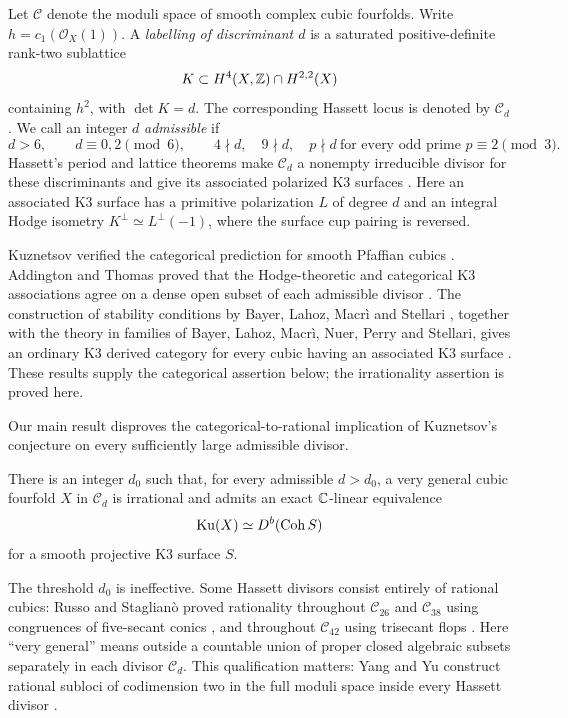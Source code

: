Let \(\mathcal C\) denote the moduli space of smooth complex cubic
fourfolds. Write \(h=c_1(\mathcal O_X(1))\). A \emph{labelling of
discriminant \(d\)} is a saturated positive-definite rank-two sublattice
\[
 K\subset H^4(X,\mathbb Z)\cap H^{2,2}(X)
\]
containing \(h^2\), with \(\det K=d\). The corresponding Hassett locus is
denoted by \(\mathcal C_d\). We call an integer \(d\) \emph{admissible} if
\begin{equation}\label{cub:admissible}
 d>6,\qquad d\equiv0,2\pmod6,\qquad
 4\nmid d,\quad 9\nmid d,\quad
 p\nmid d\ \text{for every odd prime }p\equiv2\pmod3.
\end{equation}
Hassett's period and lattice theorems make \(\mathcal C_d\) a nonempty
irreducible divisor for these discriminants and give its associated
polarized K3 surfaces \cite[Theorems~1.0.1 and~1.0.2]{Hassett00}.
Here an associated K3 surface has a primitive polarization \(L\) of
degree \(d\) and an integral Hodge isometry
\(K^\perp\simeq L^\perp(-1)\), where the surface cup pairing is reversed.

Kuznetsov verified the categorical prediction for smooth Pfaffian cubics
\cite[Theorem~3.1]{Kuznetsov10}. Addington and Thomas proved that the
Hodge-theoretic and categorical K3 associations agree on a dense open
subset of each admissible divisor \cite[Theorem~1.1]{AddingtonThomas14}.
The construction of stability conditions by Bayer, Lahoz, Macr\`i and
Stellari \cite[Theorem~1.2]{BLMS23}, together with the theory in families
of Bayer, Lahoz, Macr\`i, Nuer, Perry and Stellari, gives an ordinary K3
derived category for every cubic having an associated K3 surface
\cite[Corollary~29.7]{BLMPNS21}. These results supply the categorical
assertion below; the irrationality assertion is proved here.

Our main result disproves the categorical-to-rational implication of
Kuznetsov's conjecture on every sufficiently large admissible divisor.

\begin{theorem}\label{thm:main}
There is an integer \(d_0\) such that, for every admissible \(d>d_0\), a very
general cubic fourfold \(X\) in \(\mathcal C_d\) is irrational
and admits an exact \(\mathbb C\)-linear equivalence
\[
 \operatorname{Ku}(X)\simeq D^b(\operatorname{Coh}S)
\]
for a smooth projective K3 surface \(S\).
\end{theorem}

The threshold \(d_0\) is ineffective. Some Hassett divisors consist
entirely of rational cubics: Russo and Staglian\`o proved rationality throughout
\(\mathcal C_{26}\) and \(\mathcal C_{38}\) using congruences of
five-secant conics \cite[Theorems~4 and~7]{RussoStagliano19}, and
throughout \(\mathcal C_{42}\) using trisecant flops
\cite[Theorem~5.12]{RussoStagliano23}.
Here ``very general'' means outside a
countable union of proper closed algebraic subsets separately in each
divisor \(\mathcal C_d\).
This qualification matters: Yang and Yu construct rational subloci of
codimension two in the full moduli space inside every Hassett divisor
\cite[Theorem~9]{YangYu20}.

